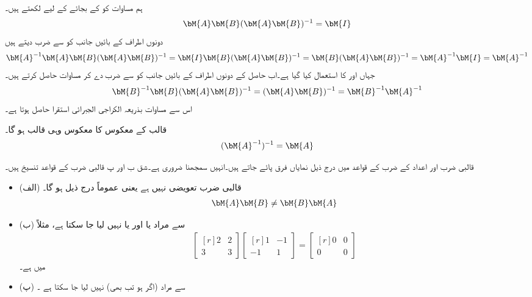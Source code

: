 ہم مساوات  کو  کے بجائے  کے لیے لکھتے ہیں۔
\begin{align*}
\bM{A}\bM{B}(\bM{A}\bM{B})^{-1}=\bM{I}
\end{align*}
دونوں اطراف کے بائیں جانب کو  سے ضرب دیتے ہیں
\begin{align*}
\bM{A}^{-1}\bM{A}\bM{B}(\bM{A}\bM{B})^{-1}=\bM{I}\bM{B}(\bM{A}\bM{B})^{-1}=\bM{B}(\bM{A}\bM{B})^{-1}=\bM{A}^{-1}\bM{I}=\bM{A}^{-1}
\end{align*}
جہاں   اور  کا استعمال کیا گیا ہے۔اب حاصل   کے دونوں اطراف کے بائیں جانب کو  سے ضرب دے کر مساوات  حاصل کرتے ہیں۔
\begin{align*}
\bM{B}^{-1}\bM{B}(\bM{A}\bM{B})^{-1}=(\bM{A}\bM{B})^{-1}=\bM{B}^{-1}\bM{A}^{-1}
\end{align*}
اس سے مساوات  بذریعہ   الکراجی الجبرائی  استقرا حاصل ہوتا ہے۔

قالب  کے معکوس کا معکوس وہی قالب  ہو گا۔
\begin{align}
(\bM{A}^{-1})^{-1}=\bM{A}
\end{align}

قالبی ضرب اور اعداد کے ضرب کے قواعد میں درج ذیل نمایاں فرق پائے جاتے ہیں۔انہیں سمجھنا ضروری ہے۔شق ب اور پ قالبی ضرب کے قواعد تنسیخ ہیں۔

\begin{itemize}
\item{(الف)}
قالبی ضرب تعویضی نہیں ہے یعنی عموماً درج ذیل ہو گا۔
\begin{align}
\bM{A}\bM{B} \ne \bM{B}\bM{A}
\end{align}
\item{(ب)}
 سے مراد  یا  اور یا  نہیں لیا جا سکتا ہے، مثلاً
\begin{align*}
\begin{bmatrix*}[r] 2&2\\3&3 \end{bmatrix*}\begin{bmatrix*}[r] 1&-1\\-1&1 \end{bmatrix*}=\begin{bmatrix*}[r] 0&0\\0&0  \end{bmatrix*}
\end{align*}
میں  ہے۔
\item{(پ)}
 سے مراد  (اگر  ہو تب بھی) نہیں لیا جا سکتا ہے ۔
\end{itemize}

